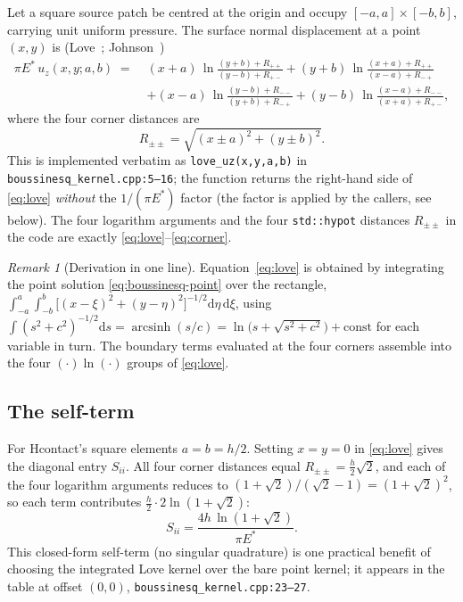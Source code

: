 \documentclass[11pt,a4paper]{article}
\newcommand{\Es}{E^{*}}
\newcommand{\code}[1]{\texttt{#1}}
\theoremstyle{definition}
\theoremstyle{remark}
\newtheorem{remark}{Remark}
\begin{document}
Let a square source patch be centred at the origin and occupy
$[-a,a]\times[-b,b]$, carrying unit uniform pressure. The surface normal
displacement at a point $(x,y)$ is (Love~\cite{Love1929};
Johnson~\cite[eq.~3.25]{Johnson1985})
\begin{equation}
\begin{aligned}
  \pi\Es\, u_z(x,y;a,b) \;=\;
  & (x+a)\,\ln\!\frac{(y+b)+R_{++}}{(y-b)+R_{+-}}
  + (y+b)\,\ln\!\frac{(x+a)+R_{++}}{(x-a)+R_{-+}} \\[2pt]
  &+ (x-a)\,\ln\!\frac{(y-b)+R_{--}}{(y+b)+R_{-+}}
  + (y-b)\,\ln\!\frac{(x-a)+R_{--}}{(x+a)+R_{+-}},
\end{aligned}
\label{eq:love}
\end{equation}
where the four corner distances are
\begin{equation}
  R_{\pm\pm} = \sqrt{(x\pm a)^2 + (y\pm b)^2}.
  \label{eq:corner}
\end{equation}
This is implemented verbatim as \code{love\_uz(x,y,a,b)} in
\code{boussinesq\_kernel.cpp:5--16}; the function returns the right-hand side of
\eqref{eq:love} \emph{without} the $1/(\pi\Es)$ factor (the factor is applied by
the callers, see below). The four logarithm arguments and the four
\code{std::hypot} distances $R_{\pm\pm}$ in the code are exactly
\eqref{eq:love}--\eqref{eq:corner}.

\begin{remark}[Derivation in one line]
Equation~\eqref{eq:love} is obtained by integrating the point solution
\eqref{eq:boussinesq-point} over the rectangle,
$\int_{-a}^{a}\!\int_{-b}^{b} \big[(x-\xi)^2+(y-\eta)^2\big]^{-1/2}
\mathrm{d}\eta\,\mathrm{d}\xi$, using
$\int (s^2+c^2)^{-1/2}\mathrm{d}s = \operatorname{arcsinh}(s/c)
=\ln\!\big(s+\sqrt{s^2+c^2}\big)+\text{const}$ for each variable in turn. The
boundary terms evaluated at the four corners assemble into the four
$(\cdot)\ln(\cdot)$ groups of \eqref{eq:love}.
\end{remark}

\subsection{The self-term}

For Hcontact's square elements $a=b=h/2$. Setting $x=y=0$ in \eqref{eq:love}
gives the diagonal entry $S_{ii}$. All four corner distances equal
$R_{\pm\pm}=\tfrac{h}{2}\sqrt2$, and each of the four logarithm arguments reduces
to $(1+\sqrt2)/(\sqrt2-1)=(1+\sqrt2)^2$, so each term contributes
$\tfrac{h}{2}\cdot 2\ln(1+\sqrt2)$:
\begin{equation}
  S_{ii} = \frac{4h\,\ln(1+\sqrt2)}{\pi \Es}.
  \label{eq:selfterm}
\end{equation}
This closed-form self-term (no singular quadrature) is one practical benefit of
choosing the integrated Love kernel over the bare point kernel; it appears in
the table at offset $(0,0)$, \code{boussinesq\_kernel.cpp:23--27}.
\end{document}
